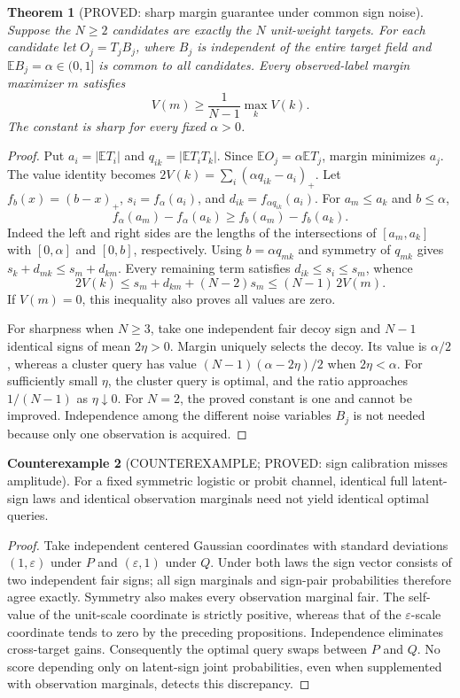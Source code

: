 \documentclass[11pt]{article}
\newtheorem{theorem}{Theorem}[section]
\theoremstyle{definition}
\newtheorem{counterexample}[theorem]{Counterexample}
\theoremstyle{remark}
\begin{document}
\begin{theorem}[PROVED: sharp margin guarantee under common sign noise]
\label{thm:bsc-margin-r3}
Suppose the $N\ge2$ candidates are exactly the $N$ unit-weight targets.
For each candidate let $O_j=T_jB_j$, where $B_j$ is independent of the
entire target field and $\mathbb{E}B_j=\alpha\in(0,1]$ is common to all
candidates. Every observed-label margin maximizer $m$ satisfies
\[
 V(m)\ge\frac{1}{N-1}\max_k V(k).
\]
The constant is sharp for every fixed $\alpha>0$.
\end{theorem}
\begin{proof}
Put $a_i=|\mathbb{E}T_i|$ and $q_{ik}=|\mathbb{E}T_iT_k|$.
Since $\mathbb{E}O_j=\alpha\mathbb{E}T_j$, margin minimizes $a_j$.
The value identity becomes
$2V(k)=\sum_i(\alpha q_{ik}-a_i)_+$.
Let $f_b(x)=(b-x)_+$, $s_i=f_\alpha(a_i)$, and
$d_{ik}=f_{\alpha q_{ik}}(a_i)$. For $a_m\le a_k$ and $b\le\alpha$,
\[
 f_\alpha(a_m)-f_\alpha(a_k)
 \ge f_b(a_m)-f_b(a_k).
\]
Indeed the left and right sides are the lengths of the intersections of
$[a_m,a_k]$ with $[0,\alpha]$ and $[0,b]$, respectively.
Using $b=\alpha q_{mk}$ and symmetry of $q_{mk}$ gives
$s_k+d_{mk}\le s_m+d_{km}$.
Every remaining term satisfies $d_{ik}\le s_i\le s_m$, whence
\[
 2V(k)
 \le s_m+d_{km}+(N-2)s_m
 \le (N-1)\,2V(m).
\]
If $V(m)=0$, this inequality also proves all values are zero.

For sharpness when $N\ge3$, take one independent fair decoy sign and
$N-1$ identical signs of mean $2\eta>0$. Margin uniquely selects the
decoy. Its value is $\alpha/2$, whereas a cluster query has value
$(N-1)(\alpha-2\eta)/2$ when $2\eta<\alpha$. For sufficiently small
$\eta$, the cluster query is optimal, and the ratio approaches
$1/(N-1)$ as $\eta\downarrow0$. For $N=2$, the proved constant is one
and cannot be improved. Independence among the different noise variables
$B_j$ is not needed because only one observation is acquired.
\end{proof}

\begin{counterexample}[COUNTEREXAMPLE; PROVED: sign calibration misses amplitude]
\label{ce:amplitude-swap-r3}
For a fixed symmetric logistic or probit channel, identical full
latent-sign laws and identical observation marginals need not yield
identical optimal queries.
\end{counterexample}
\begin{proof}
Take independent centered Gaussian coordinates with standard deviations
$(1,\varepsilon)$ under $P$ and $(\varepsilon,1)$ under $Q$.
Under both laws the sign vector consists of two independent fair signs;
all sign marginals and sign-pair probabilities therefore agree exactly.
Symmetry also makes every observation marginal fair.
The self-value of the unit-scale coordinate is strictly positive,
whereas that of the $\varepsilon$-scale coordinate tends to zero by the
preceding propositions. Independence eliminates cross-target gains.
Consequently the optimal query swaps between $P$ and $Q$.
No score depending only on latent-sign joint probabilities, even when
supplemented with observation marginals, detects this discrepancy.
\end{proof}
\end{document}
